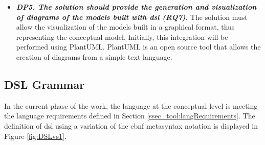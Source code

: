 \begin{itemize}
    \item\textit{\textbf{DP5. The solution should provide the generation and visualization of diagrams of the models built with \ac{dsl} (RQ7).}}
    The solution must allow the visualization of the models built in a graphical format, thus representing the conceptual model.
    Initially, this integration will be performed using PlantUML.
    PlantUML is an open source tool that allows the creation of diagrams from a simple text language.
\end{itemize}


\subsection{DSL Grammar} \label{ssec_tool:grammar}

In the current phase of the work, the language at the conceptual level is meeting the language requirements defined in Section \ref{ssec_tool:langRequirements}.
The definition of \ac{dsl} using a variation of the \ac{ebnf} metasyntax notation is displayed in Figure \autoref{fig:DSLvs1}.


